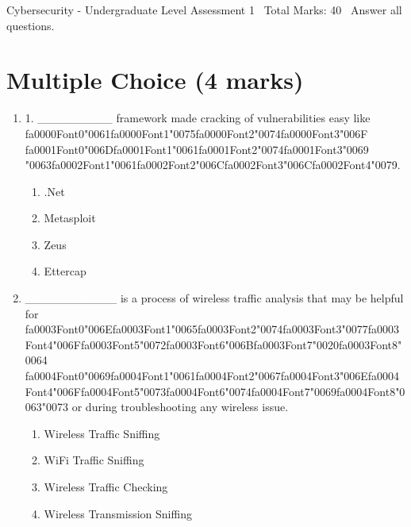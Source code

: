 \documentclass[12pt]{article}
\begin{document}
\begin{center}
Cybersecurity - Undergraduate Level Assessment 1 \
Total Marks: 40 \
Answer all questions.
\end{center}

\section*{Multiple Choice (4 marks)}
\begin{enumerate}[label=\arabic*.]
\item 1. \_\_\_\_\_\_\_\_\_ framework made cracking of vulnerabilities easy like {\csname fa0000Font0\endcsname\char"0061}{\csname fa0000Font1\endcsname\char"0075}{\csname fa0000Font2\endcsname\char"0074}{\csname fa0000Font3\endcsname\char"006F} {\csname fa0001Font0\endcsname\char"006D}{\csname fa0001Font1\endcsname\char"0061}{\csname fa0001Font2\endcsname\char"0074}{\csname fa0001Font3\endcsname\char"0069} {\char"0063}{\csname fa0002Font1\endcsname\char"0061}{\csname fa0002Font2\endcsname\char"006C}{\csname fa0002Font3\endcsname\char"006C}{\csname fa0002Font4\endcsname\char"0079}.
\begin{enumerate}[label=(\alph*)]
    \item .Net
    \item Metasploit
    \item Zeus
    \item Ettercap
\end{enumerate}
\item \_\_\_\_\_\_\_\_\_\_\_ is a process of wireless traffic analysis that may be helpful for {\csname fa0003Font0\endcsname\char"006E}{\csname fa0003Font1\endcsname\char"0065}{\csname fa0003Font2\endcsname\char"0074}{\csname fa0003Font3\endcsname\char"0077}{\csname fa0003Font4\endcsname\char"006F}{\csname fa0003Font5\endcsname\char"0072}{\csname fa0003Font6\endcsname\char"006B}{\csname fa0003Font7\endcsname\char"0020}{\csname fa0003Font8\endcsname\char"0064} {\csname fa0004Font0\endcsname\char"0069}{\csname fa0004Font1\endcsname\char"0061}{\csname fa0004Font2\endcsname\char"0067}{\csname fa0004Font3\endcsname\char"006E}{\csname fa0004Font4\endcsname\char"006F}{\csname fa0004Font5\endcsname\char"0073}{\csname fa0004Font6\endcsname\char"0074}{\csname fa0004Font7\endcsname\char"0069}{\csname fa0004Font8\endcsname\char"0063}{\char"0073} or during troubleshooting any wireless issue.
\begin{enumerate}[label=(\alph*)]
    \item Wireless Traffic Sniffing
    \item WiFi Traffic Sniffing
    \item Wireless Traffic Checking
    \item Wireless Transmission Sniffing
\end{enumerate}
\end{enumerate}
\end{document}
